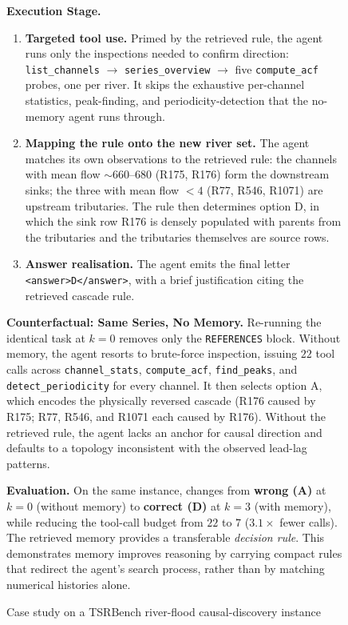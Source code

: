 \begin{figure}[h]
{\begin{tcolorbox}[colback=gray!5!white, colframe=brown!55,
title=Case Study C.2: \method{} on TSRBench: How Retrieved Memory Steer the Decision,
boxrule=0.3mm, width=1.2\textwidth, arc=2mm, auto outer arc=true]
\textbf{Execution Stage.}
\begin{enumerate}
    \item \textbf{Targeted tool use.}
    Primed by the retrieved rule, the agent runs only the inspections needed to confirm direction: \texttt{list\_channels} $\to$ \texttt{series\_overview} $\to$ five \texttt{compute\_acf} probes, one per river. It skips the exhaustive per-channel statistics, peak-finding, and periodicity-detection that the no-memory agent runs through.

    \item \textbf{Mapping the rule onto the new river set.} The agent matches its own observations to the retrieved rule: the channels with mean flow $\sim\!660$--$680$ (R175, R176) form the downstream sinks; the three with mean flow $<\!4$ (R77, R546, R1071) are upstream tributaries. The rule then determines option D, in which the sink row R176 is densely populated with parents from the tributaries and the tributaries themselves are source rows.

    \item \textbf{Answer realisation.} The agent emits the final letter \texttt{<answer>D</answer>}, with a brief justification citing the retrieved cascade rule.
\end{enumerate}


\textbf{Counterfactual: Same Series, No Memory.}
Re-running the identical task at $k\!=\!0$ removes only the \texttt{REFERENCES} block. Without memory, the agent resorts to brute-force inspection, issuing $22$ tool calls across \texttt{channel\_stats}, \texttt{compute\_acf}, \texttt{find\_peaks}, and \texttt{detect\_periodicity} for every channel. It then selects option A, which encodes the physically reversed cascade (R176 caused by R175; R77, R546, and R1071 each caused by R176). Without the retrieved rule, the agent lacks an anchor for causal direction and defaults to a topology inconsistent with the observed lead-lag patterns.

\vspace{2mm}
\textbf{Evaluation.} On the same instance, \method{} changes from \textbf{wrong (A)} at $k\!=\!0$ (without memory) to \textbf{correct (D)} at $k\!=\!3$ (with memory), while reducing the tool-call budget from $22$ to $7$ ($3.1\!\times$ fewer calls). 
The retrieved memory provides a transferable \emph{decision rule}. 
This demonstrates memory improves reasoning by carrying compact rules that redirect the agent's search process, rather than by matching numerical histories alone.


\end{tcolorbox}}
\caption{Case study on a TSRBench river-flood causal-discovery instance}
\label{fig:tsrbench_case_study_causal_box}
\end{figure}










